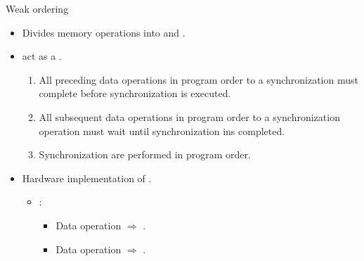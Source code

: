 \begin{frame}[t]{Weak ordering}
\begin{itemize}
  \item Divides memory operations into  
        and .

  \item {} act as a .
    \begin{enumerate}
      \item All preceding data operations in program order to a synchronization 
            must complete before synchronization is executed.
      \item All subsequent data operations in program order to a synchronization 
            operation must wait until synchronization ins completed.
      \item Synchronization are performed in program order.
    \end{enumerate}

  \item Hardware implementation of .
    \begin{itemize}
      \item {}:
        \begin{itemize}
          \item Data operation  $\Rightarrow$ .
          \item Data operation  $\Rightarrow$ .
        \end{itemize}
    \end{itemize}
\end{itemize}
\end{frame}

